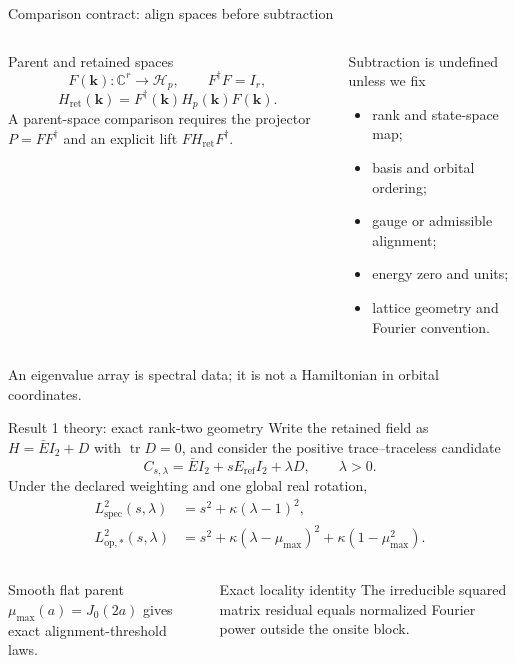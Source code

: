 \documentclass[aspectratio=169,10pt]{beamer}
\begin{document}
\begin{frame}{Comparison contract: align spaces before subtraction}
  \begin{columns}[T]
      \begin{block}{Parent and retained spaces}
        \[
          F(\mathbf k):\mathbb C^r\rightarrow\mathcal H_p,
          \qquad F^\dagger F=I_r,
        \]
        \[
          H_{\mathrm{ret}}(\mathbf k)
          =F^\dagger(\mathbf k)H_p(\mathbf k)F(\mathbf k).
        \]
        A parent-space comparison requires the projector $P=FF^\dagger$ and an explicit
        lift $F H_{\mathrm{ret}}F^\dagger$.
      \end{block}
      \begin{alertblock}{Subtraction is undefined unless we fix}
        \begin{itemize}
          \item rank and state-space map;
          \item basis and orbital ordering;
          \item gauge or admissible alignment;
          \item energy zero and units;
          \item lattice geometry and Fourier convention.
        \end{itemize}
      \end{alertblock}
  \end{columns}

  \vspace{0.5em}
  \centering
  An eigenvalue array is spectral data; it is not a Hamiltonian in orbital coordinates.
\end{frame}

\begin{frame}{Result 1 theory: exact rank-two geometry}
  Write the retained field as $H=\bar E I_2+D$ with $\operatorname{tr}D=0$, and consider
  the positive trace--traceless candidate
  \[
    C_{s,\lambda}=\bar E I_2+sE_{\mathrm{ref}}I_2+\lambda D,
    \qquad \lambda>0.
  \]
  Under the declared weighting and one global real rotation,
  \begin{align*}
    L_{\mathrm{spec}}^2(s,\lambda)
      &=s^2+\kappa(\lambda-1)^2,\\
    L_{\mathrm{op},*}^2(s,\lambda)
      &=s^2+\kappa(\lambda-\mu_{\max})^2
        +\kappa(1-\mu_{\max}^2).
  \end{align*}

  \begin{columns}[T]
      \begin{block}{Smooth flat parent}
        $\mu_{\max}(a)=J_0(2a)$ gives exact alignment-threshold laws.
      \end{block}
      \begin{block}{Exact locality identity}
        The irreducible squared matrix residual equals normalized Fourier power outside
        the onsite block.
      \end{block}
  \end{columns}
\end{frame}
\end{document}
